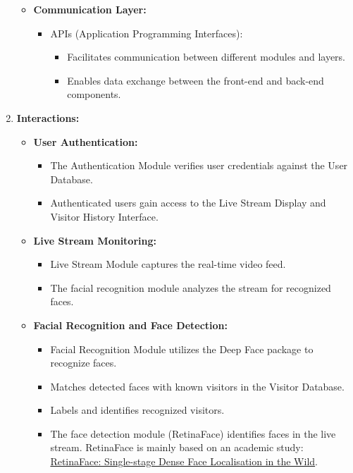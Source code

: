 \documentclass[a4 paper, 12pt]{article}
\begin{document}
\begin{enumerate}
\begin{itemize}
            \item \textbf{Communication Layer:}
                \begin{itemize}
                    \item APIs (Application Programming Interfaces):
                        \begin{itemize}
                            \item Facilitates communication between different modules and layers.
                            \item Enables data exchange between the front-end and back-end components.
                        \end{itemize}
                \end{itemize}
        \end{itemize}

    \item \textbf{Interactions:}
        \begin{itemize}
            \item \textbf{User Authentication:}
                \begin{itemize}
                    \item The Authentication Module verifies user credentials against the User Database.
                    \item Authenticated users gain access to the Live Stream Display and Visitor History Interface.
                \end{itemize}
            
            \item \textbf{Live Stream Monitoring:}
                \begin{itemize}
                    \item Live Stream Module captures the real-time video feed.
                    \item The facial recognition module analyzes the stream for recognized faces.
                \end{itemize}
            
            \item \textbf{Facial Recognition and Face Detection:}
                \begin{itemize}
                    \item Facial Recognition Module utilizes the Deep Face package to recognize faces.
                    \item Matches detected faces with known visitors in the Visitor Database.
                    \item Labels and identifies recognized visitors.
                    \item The face detection module (RetinaFace) identifies faces in the live stream. RetinaFace is mainly based on an academic study: \href{https://arxiv.org/pdf/1905.00641.pdf}{RetinaFace: Single-stage Dense Face Localisation in the Wild}.


\end{itemize}
\end{itemize}
\end{enumerate}
\end{document}
